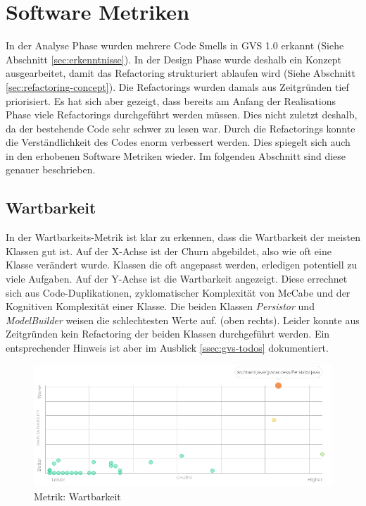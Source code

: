 \documentclass[11pt,a4paper,english,oneside]{book}
\numberwithin{equation}{chapter}
\begin{document}
	\section{Software Metriken} \label{sec:metrics-2}
	In der Analyse Phase wurden mehrere Code Smells in GVS 1.0 erkannt (Siehe Abschnitt \ref{sec:erkenntnisse}). In der Design Phase wurde deshalb ein Konzept ausgearbeitet, damit das Refactoring strukturiert ablaufen wird (Siehe Abschnitt \ref{sec:refactoring-concept}). Die Refactorings wurden damals aus Zeitgründen tief priorisiert. Es hat sich aber gezeigt, dass bereits am Anfang der Realisations Phase viele Refactorings durchgeführt werden müssen. Dies nicht zuletzt deshalb, da der bestehende Code sehr schwer zu lesen war. Durch die Refactorings konnte die Verständlichkeit des Codes enorm verbessert werden. Dies spiegelt sich auch in den erhobenen Software Metriken wieder. Im folgenden Abschnitt sind diese genauer beschrieben.
	
	\subsection{Wartbarkeit}
	In der Wartbarkeits-Metrik \cite{metric-maintainability} ist klar zu erkennen, dass die Wartbarkeit der meisten Klassen gut ist. Auf der X-Achse ist der Churn \cite{metric-churn} abgebildet, also wie oft eine Klasse verändert wurde. Klassen die oft angepasst werden, erledigen potentiell zu viele Aufgaben. Auf der Y-Achse ist die Wartbarkeit angezeigt. Diese errechnet sich aus Code-Duplikationen, zyklomatischer Komplexität von McCabe \cite{mccabe} und der Kognitiven Komplexität \cite{metric-cognitive-complexity} einer Klasse. Die beiden Klassen \textit{Persistor} und \textit{ModelBuilder} weisen die schlechtesten Werte auf. (oben rechts). Leider konnte aus Zeitgründen kein Refactoring der beiden Klassen durchgeführt werden. Ein entsprechender Hinweis ist aber im Ausblick \ref{ssec:gvs-todos} dokumentiert.
	
	\clearpage
	
	\begin{figure}[h!]
		\centering
		\includegraphics[width=\linewidth]{assets/images/metrics/maintainability}
		\caption{Metrik: Wartbarkeit}
		\label{fig:metric-maintainability}
	\end{figure}
	
\end{document}

